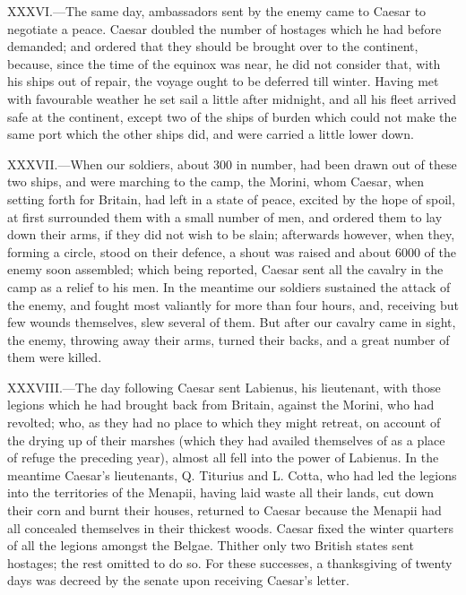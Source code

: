 XXXVI.—The same day, ambassadors sent by the enemy came to Caesar to
negotiate a peace. Caesar doubled the number of hostages which he had
before demanded; and ordered that they should be brought over to the
continent, because, since the time of the equinox was near, he did not
consider that, with his ships out of repair, the voyage ought to be
deferred till winter. Having met with favourable weather he set sail a
little after midnight, and all his fleet arrived safe at the continent,
except two of the ships of burden which could not make the same port
which the other ships did, and were carried a little lower down.

XXXVII.—When our soldiers, about 300 in number, had been drawn out of
these two ships, and were marching to the camp, the Morini, whom Caesar,
when setting forth for Britain, had left in a state of peace, excited by
the hope of spoil, at first surrounded them with a small number of men,
and ordered them to lay down their arms, if they did not wish to be
slain; afterwards however, when they, forming a circle, stood on their
defence, a shout was raised and about 6000 of the enemy soon assembled;
which being reported, Caesar sent all the cavalry in the camp as a
relief to his men. In the meantime our soldiers sustained the attack of
the enemy, and fought most valiantly for more than four hours, and,
receiving but few wounds themselves, slew several of them. But after our
cavalry came in sight, the enemy, throwing away their arms, turned their
backs, and a great number of them were killed.

XXXVIII.—The day following Caesar sent Labienus, his lieutenant, with
those legions which he had brought back from Britain, against the
Morini, who had revolted; who, as they had no place to which they might
retreat, on account of the drying up of their marshes (which they had
availed themselves of as a place of refuge the preceding year), almost
all fell into the power of Labienus. In the meantime Caesar's
lieutenants, Q. Titurius and L. Cotta, who had led the legions into the
territories of the Menapii, having laid waste all their lands, cut down
their corn and burnt their houses, returned to Caesar because the
Menapii had all concealed themselves in their thickest woods. Caesar
fixed the winter quarters of all the legions amongst the Belgae. Thither
only two British states sent hostages; the rest omitted to do so. For
these successes, a thanksgiving of twenty days was decreed by the senate
upon receiving Caesar's letter.


